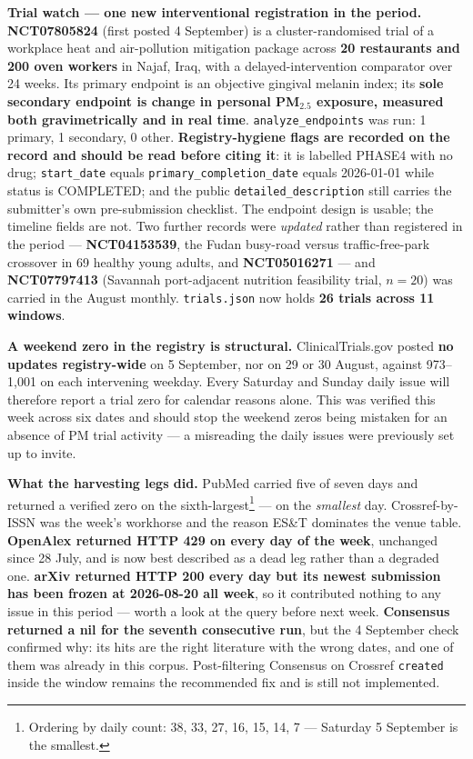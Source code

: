 \documentclass[10pt]{article}
\begin{document}
\vspace{1.5mm}
\textbf{Trial watch --- one new interventional registration in the period.}
\textbf{NCT07805824} (first posted 4 September) is a cluster-randomised trial of a
workplace heat and air-pollution mitigation package across \textbf{20 restaurants and 200
oven workers} in Najaf, Iraq, with a delayed-intervention comparator over 24 weeks. Its
primary endpoint is an objective gingival melanin index; its \textbf{sole secondary
endpoint is change in personal PM$_{2.5}$ exposure, measured both gravimetrically and in
real time}. \texttt{analyze\_endpoints} was run: 1 primary, 1 secondary, 0 other.
\textbf{Registry-hygiene flags are recorded on the record and should be read before
citing it}: it is labelled PHASE4 with no drug; \texttt{start\_date} equals
\texttt{primary\_completion\_date} equals 2026-01-01 while status is COMPLETED; and the
public \texttt{detailed\_description} still carries the submitter's own pre-submission
checklist. The endpoint design is usable; the timeline fields are not.
Two further records were \emph{updated} rather than registered in the period ---
\textbf{NCT04153539}, the Fudan busy-road versus traffic-free-park crossover in 69 healthy
young adults, and \textbf{NCT05016271} --- and \textbf{NCT07797413} (Savannah
port-adjacent nutrition feasibility trial, $n=20$) was carried in the August monthly.
\texttt{trials.json} now holds \textbf{26 trials across 11 windows}.

\vspace{1.5mm}
\textbf{A weekend zero in the registry is structural.} ClinicalTrials.gov posted
\textbf{no updates registry-wide} on 5 September, nor on 29 or 30 August, against
973--1{,}001 on each intervening weekday. Every Saturday and Sunday daily issue will
therefore report a trial zero for calendar reasons alone. This was verified this week
across six dates and should stop the weekend zeros being mistaken for an absence of PM
trial activity --- a misreading the daily issues were previously set up to invite.

\vspace{1.5mm}
\textbf{What the harvesting legs did.} PubMed carried five of seven days and returned a
verified zero on the sixth-largest\footnote{Ordering by daily count: 38, 33, 27, 16, 15,
14, 7 --- Saturday 5 September is the smallest.} --- on the \emph{smallest} day.
Crossref-by-ISSN was the week's workhorse and the reason ES\&T dominates the venue table.
\textbf{OpenAlex returned HTTP 429 on every day of the week}, unchanged since 28 July, and
is now best described as a dead leg rather than a degraded one. \textbf{arXiv returned
HTTP 200 every day but its newest submission has been frozen at 2026-08-20 all week}, so
it contributed nothing to any issue in this period --- worth a look at the query before
next week. \textbf{Consensus returned a nil for the seventh consecutive run}, but the
4 September check confirmed why: its hits are the right literature with the wrong dates,
and one of them was already in this corpus. Post-filtering Consensus on Crossref
\texttt{created} inside the window remains the recommended fix and is still not
implemented.
\end{document}

